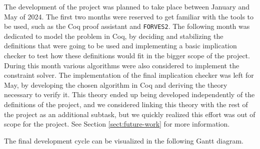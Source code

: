 The development of the project was planned to take place between January and May of 2024.
The first two months were reserved to get familiar with the tools to be used, such as the
Coq proof assistant and \verb|FORVES2|. The following month was dedicated to model the
problem in Coq, by deciding and stabilizing the definitions that were going to be used and
implementing a basic implication checker to test how these definitions would fit in the
bigger scope of the project. During this month various algorithms were also considered to
implement the constraint solver. The implementation of the final implication checker was
left for May, by developing the chosen algorithm in Coq and deriving the theory necessary
to verify it. This theory ended up being developed independently of the definitions of the
project, and we considered linking this theory with the rest of the project as an 
additional subtask, but we quickly realized this effort was out of scope for the project.
See Section \ref{sect:future-work} for more information.

The final development cycle can be visualized in the following Gantt diagram.

